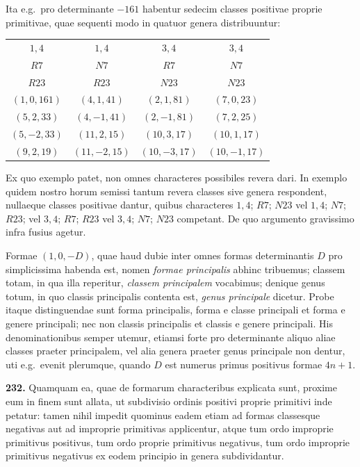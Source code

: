\documentclass[12pt,a4paper]{article}
\theoremstyle{plain}
\theoremstyle{definition}
\theoremstyle{remark}
\begin{document}
Ita e.g.\ pro determinante $-161$ habentur sedecim classes positivae proprie primitivae, quae sequenti modo in quatuor genera distribuuntur:
\begin{center}
\begin{tabular}{|c|c|c|c|}
\hline
$1,4$ & $1,4$ & $3,4$ & $3,4$ \\
$R7$ & $N7$ & $R7$ & $N7$ \\
$R23$ & $R23$ & $N23$ & $N23$ \\
\hline
$(1,0,161)$ & $(4,1,41)$ & $(2,1,81)$ & $(7,0,23)$ \\
$(5,2,33)$ & $(4,-1,41)$ & $(2,-1,81)$ & $(7,2,25)$ \\
$(5,-2,33)$ & $(11,2,15)$ & $(10,3,17)$ & $(10,1,17)$ \\
$(9,2,19)$ & $(11,-2,15)$ & $(10,-3,17)$ & $(10,-1,17)$ \\
\hline
\end{tabular}
\end{center}
Ex quo exemplo patet, non omnes characteres possibiles revera dari. In exemplo quidem nostro horum semissi tantum revera classes sive genera respondent, nullaeque classes positivae dantur, quibus characteres $1,4$; $R7$; $N23$ vel $1,4$; $N7$; $R23$; vel $3,4$; $R7$; $R23$ vel $3,4$; $N7$; $N23$ competant. De quo argumento gravissimo infra fusius agetur.

Formae $(1,0,-D)$, quae haud dubie inter omnes formas determinantis $D$ pro simplicissima habenda est, nomen \emph{formae principalis} abhinc tribuemus; classem totam, in qua illa reperitur, \emph{classem principalem} vocabimus; denique genus totum, in quo classis principalis contenta est, \emph{genus principale} dicetur. Probe itaque distinguendae sunt forma principalis, forma e classe principali et forma e genere principali; nec non classis principalis et classis e genere principali. His denominationibus semper utemur, etiamsi forte pro determinante aliquo aliae classes praeter principalem, vel alia genera praeter genus principale non dentur, uti e.g.\ evenit plerumque, quando $D$ est numerus primus positivus formae $4n+1$.

\textbf{232.}
Quamquam ea, quae de formarum characteribus explicata sunt, proxime eum in finem sunt allata, ut subdivisio ordinis positivi proprie primitivi inde petatur: tamen nihil impedit quominus eadem etiam ad formas classesque negativas aut ad improprie primitivas applicentur, atque tum ordo improprie primitivus positivus, tum ordo proprie primitivus negativus, tum ordo improprie primitivus negativus ex eodem principio in genera subdividantur.
\end{document}
